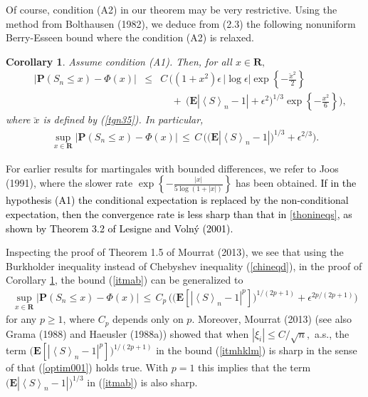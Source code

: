 \documentclass{gSTA2e}
\theoremstyle{plain}
\newtheorem{corollary}[theorem]{Corollary}
\theoremstyle{definition}
\theoremstyle{remark}
\begin{document}
Of course, condition (A2) in our theorem may be very restrictive.
Using  the  method from Bolthausen (1982), we  deduce from (2.3) the following nonuniform Berry-Esseen bound where the condition (A2) is relaxed.

\begin{corollary}\label{co2.1}
Assume condition  (A1). Then, for all $x \in \mathbf{R},$
\begin{eqnarray} \label{thonineqs}
\ \ \ \ \ \Big| \mathbf{P}(S_n \leq x )-  \Phi\left( x\right) \Big|  \!\!  & \leq & \!\!  C \,  \bigg(\! \left(  1+ x^2 \right)\epsilon \, |\log \epsilon| \exp\left\{-\frac{ \breve{x} ^2}{2}\right\} \\
& &\ \ \ \ \  + \ \Big( \mathbf{E} |\! \left\langle S\right\rangle_n -1| + \epsilon^2 \Big)^{1/3}  \exp\left\{-\frac{x^2}{6}\right\} \bigg),\nonumber
\end{eqnarray}
where $ \breve{x} $ is defined by (\ref{tgn35}).
In particular,
\begin{eqnarray} \label{itmab}
\sup_{x \in \mathbf{R}} \Big|\mathbf{P}(S_n\leq x) - \Phi(x) \Big| \, \leq \, C \,  \bigg( \Big(\mathbf{E} |\! \left\langle S\right\rangle_n -1| \Big)^{1/3} + \epsilon^{2/3} \bigg) .
\end{eqnarray}
\end{corollary}

For earlier results for martingales with bounded  differences, we refer to Joos (1991),
where the slower rate $\exp\left\{-\frac{|x|}{5 \log(1+|x|)}\right\}$ has been obtained.
\textcolor{black}{If in the hypothesis (A1) the conditional expectation is replaced by the non-conditional expectation,
then the convergence rate is less sharp than that in \eqref{thonineqs},
as shown by Theorem 3.2 of Lesigne and Voln\'y (2001).}
 

Inspecting the proof of Theorem 1.5 of  Mourrat (2013),
we see that using the Burkholder inequality instead of Chebyshev  inequality (\ref{chineqd}),
in the proof of Corollary \ref{co2.1},
the bound (\ref{itmab}) can be generalized  to
\begin{eqnarray} \label{itmhklm}
\sup_{x \in \mathbf{R}} \Big|\mathbf{P}(S_n\leq x) - \Phi(x) \Big|\, \leq \, C_p \,   \bigg( \Big(\mathbf{E}[| \left\langle S\right\rangle_n -1|^p] \Big)^{1/(2p+1) } + \epsilon^{2p/(2p+1)}   \bigg)
\end{eqnarray}
for any  $p\geq 1$, where $C_p$ depends only on $p$. Moreover,
 Mourrat (2013) (see also Grama (1988) and Haeusler   (1988a)) showed that when $|\xi_i|\leq C/\sqrt{n},$ a.s.,  the term $\big(\mathbf{E}[| \left\langle S\right\rangle_n -1|^p] \big)^{1/(2p+1) }$ in the bound (\ref{itmhklm}) is sharp in the sense of that (\ref{optim001}) holds true.
 With $p=1$ this implies that the term $\big(\mathbf{E}| \left\langle S\right\rangle_n -1| \big)^{1/3 }$ in (\ref{itmab}) is also sharp.
\end{document}
